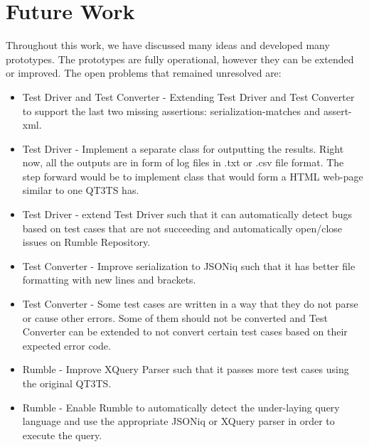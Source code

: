 \section{Future Work}
Throughout this work, we have discussed many ideas and developed many prototypes. The prototypes are fully operational, however they can be extended or improved. The open problems that remained unresolved are:
\begin{itemize}
	\item Test Driver and Test Converter - Extending Test Driver and Test Converter to support the last two missing assertions: serialization-matches and assert-xml.
	\item Test Driver - Implement a separate class for outputting the results. Right now, all the outputs are in form of log files in .txt or .csv file format. The step forward would be to implement class that would form a HTML web-page similar to one QT3TS has.
	\item Test Driver - extend Test Driver such that it can automatically detect bugs based on test cases that are not succeeding and automatically open/close issues on Rumble Repository.
	\item Test Converter - Improve serialization to JSONiq such that it has better file formatting with new lines and brackets.
	\item Test Converter - Some test cases are written in a way that they do not parse or cause other errors. Some of them should not be converted and Test Converter can be extended to not convert certain test cases based on their expected error code.
	\item Rumble - Improve XQuery Parser such that it passes more test cases using the original QT3TS.
	\item Rumble - Enable Rumble to automatically detect the under-laying query language and use the appropriate JSONiq or XQuery parser in order to execute the query. 
\end{itemize}